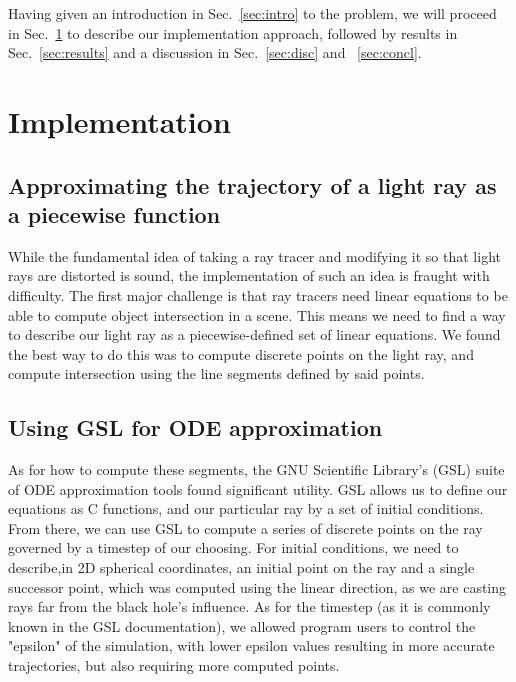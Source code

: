 Having given an introduction in Sec.~\ref{sec:intro} to the problem, we will proceed in Sec.~\ref{sec:impl} to describe our implementation approach, followed by results in  Sec.~\ref{sec:results} and a discussion in Sec.~\ref{sec:disc} and ~\ref{sec:concl}.



\section{Implementation}
\label{sec:impl}


\subsection{Approximating the trajectory of a light ray as a piecewise function}
While the fundamental idea of taking a ray tracer and modifying it so that light rays are distorted is sound, the implementation of such an idea is fraught with difficulty. The first major challenge is that ray tracers need linear equations to be able to compute object intersection in a scene. This means we need to find a way to describe our light ray as a piecewise-defined set of linear equations. We found the best way to do this was to compute discrete points on the light ray, and compute intersection using the line segments defined by said points. 


\subsection{Using GSL for ODE approximation}
As for how to compute these segments, the GNU Scientific Library's (GSL) suite \cite{10.5555/1538674} of ODE approximation tools found significant utility. GSL allows us to define our equations as C functions, and our particular ray by a set of initial conditions. From there, we can use GSL to compute a series of discrete points on the ray governed by a timestep of our choosing. For initial conditions, we need to describe,in 2D spherical coordinates, an initial point on the ray and a single successor point, which was computed using the linear direction, as we are casting rays far from the black hole's influence. As for the timestep (as it is commonly known in the GSL documentation), we allowed program users to control the "epsilon"  of the simulation, with lower epsilon values resulting in more accurate trajectories, but also requiring more computed points. 

